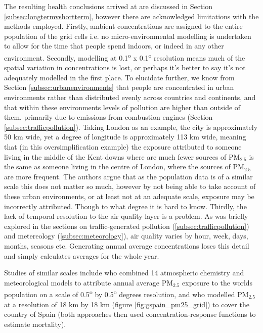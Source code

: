 The resulting health conclusions arrived at are discussed in Section \ref{subsec:longtermvshortterm}, however there are acknowledged limitations with the methods employed. Firstly, ambient concentrations are assigned to the entire population of the grid cells i.e. no micro-environmental modelling is undertaken to allow for the time that people spend indoors, or indeed in any other environment. Secondly, modelling at 0.1\textsuperscript{o} x 0.1\textsuperscript{o} resolution means much of the spatial variation in concentrations is lost, or perhaps it's better to say it's not adequately modelled in the first place. To elucidate further, we know from Section \ref{subsec:urbanenvironments} that people are concentrated in urban environments rather than distributed evenly across countries and continents, and that within these environments levels of pollution are higher than outside of them, primarily due to emissions from combustion engines (Section \ref{subsec:trafficpollution}). Taking London as an example, the city is approximately 50 km wide, yet a degree of longitude is approximately 113 km wide, meaning that (in this oversimplification example) the exposure attributed to someone living in the middle of the Kent downs where are much fewer sources of PM$_{2.5}$ is the same as someone living in the centre of London, where the sources of PM$_{2.5}$ are more frequent. The authors argue that as the population data is of a similar scale this does not matter so much, however by not being able to take account of these urban environments, or at least not at an adequate scale, exposure may be incorrectly attributed. Though to what degree it is hard to know. Thirdly, the lack of temporal resolution to the air quality layer is a problem. As was briefly explored in the sections on traffic-generated pollution (\ref{subsec:trafficpollution}) and metereology (\ref{subsec:meteorology}), air quality varies by hour, week, days, months, seasons etc. Generating annual average concentrations loses this detail and simply calculates averages for the whole year.

Studies of similar scales include \cite{Silva2013} who combined 14 atmospheric chemistry and meteorological models to attribute annual average PM$_{2.5}$ exposure to the worlds population on a scale of 0.5\textsuperscript{o} by 0.5\textsuperscript{o} degrees resolution, and \cite{Boldo2011} who modelled PM$_{2.5}$ at a resolution of 18 km by 18 km (figure \ref{fig:gspain_pm25_grid}) to cover the country of Spain (both approaches then used concentration-response functions to estimate mortality).

